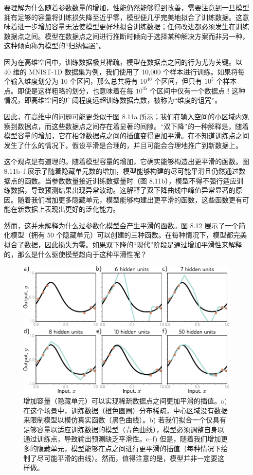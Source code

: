 \documentclass[lang=cn,newtx,10pt,scheme=chinese]{elegantbook}
\begin{document}
要理解为什么随着参数数量的增加，性能仍然能够得到改善，需要注意到一旦模型拥有足够的容量将训练损失降至近乎零，模型便几乎完美地拟合了训练数据。这意味着进一步增加容量无法使模型更好地拟合训练数据；任何改进都必须发生在训练数据点之间。模型在数据点之间进行推断时倾向于选择某种解决方案而非另一种，这种倾向称为模型的“归纳偏置”。

因为在高维空间中，训练数据极其稀疏，模型在数据点之间的行为尤为关键。以 40 维的 MNIST-1D 数据集为例，我们使用了 10,000 个样本进行训练。如果将每个输入维度划分为 10 个区间，那么总共将有 $10^{40}$ 个区间，但只有 $10^5$ 个样本点。即使是这样粗略的划分，也意味着在每 $10^{35}$ 个区间中仅有一个数据点！这种情况，即高维空间的广阔程度远超训练数据点数，被称为“维度的诅咒”。

因此，在高维中的问题可能更类似于图 8.11a 所示；我们在输入空间的小区域内观察到数据点，而这些数据点之间存在着显著的间隙。“双下降”的一种解释是，随着模型容量的增加，它在相邻数据点之间的插值变得更加平滑。在不知道训练点之间发生了什么的情况下，假设平滑是合理的，并且可能会合理地推广到新数据上。

这个观点是有道理的。随着模型容量的增加，它确实能够构造出更平滑的函数。图 8.11b–f 展示了随着隐藏单元数的增加，模型能够构建的尽可能平滑且仍然通过数据点的函数。当参数数量接近训练数据量时（图 8.11b），模型不得不强行适应训练数据，导致预测结果出现异常波动。这解释了双下降曲线中峰值异常显著的原因。随着我们增加更多隐藏单元，模型能够构建出更平滑的函数，这些函数更有可能在新数据上表现出更好的泛化能力。

然而，这并未解释为什么过参数化模型会产生平滑的函数。图 8.12 展示了一个简化模型（拥有 50 个隐藏单元）可以创建的三种函数。在每种情况下，模型都完美拟合了数据，因此损失为零。如果双下降的“现代”阶段是通过增加平滑性来解释的，那么是什么驱使模型趋向于这种平滑性呢？

\begin{figure}[ht!]
\centering
\includegraphics[width=0.7\linewidth]{PDFFigures/UDLChap8PDF/PerfSmoothness.pdf}
\caption{增加容量（隐藏单元）可以实现稀疏数据点之间更加平滑的插值。a) 在这个场景中，训练数据（橙色圆圈）分布稀疏，中心区域没有数据来限制模型以模仿真实函数（黑色曲线）。b) 若我们拟合一个仅具有足够容量以适应训练数据的模型（青色曲线），模型必须调整自身以通过训练点，导致输出预测缺乏平滑性。c–f) 但是，随着我们增加更多的隐藏单元，模型能够在点之间进行更平滑的插值（每种情况下绘制了尽可能平滑的曲线）。然而，值得注意的是，模型并非一定要这样做。}
\end{figure}
\end{document}
